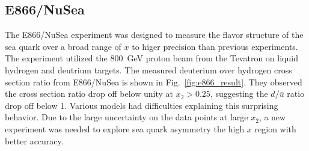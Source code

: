 \subsection{E866/NuSea}
\label{sec:E866}
The E866/NuSea experiment was designed to measure the flavor structure of the sea 
quark over a broad range of $x$ to higer precision than previous experiments. The 
experiment utilized the \SI{800}{\GeV} proton beam from the Tevatron on liquid 
hydrogen and deutrium targets. The measured deuterium over hydrogen cross section 
ratio from E866/NuSea is shown in Fig.\ \ref{fig:e866_result}. They observed the
cross section ratio drop off below unity at $x_2>0.25$, suggesting the $\bar{d}/\bar{u}$ 
ratio drop off below 1. Various models had difficulties explaining this surprising 
behavior. Due to the large uncertainty on the data points at large $x_2$, a new 
experiment was needed to explore sea quark asymmetry the high $x$ region with better 
accuracy.

